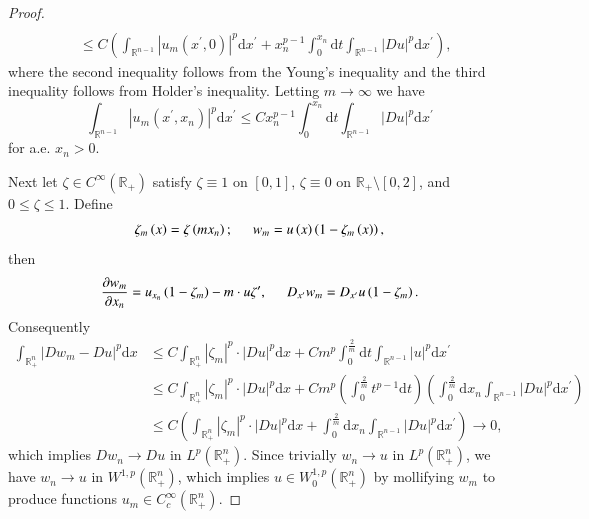 \begin{proof}
$$\begin{aligned}
\\
&\le C\left( \int_{\mathbb{R} ^{n-1}}{\left| u_m\left( x^{\prime},0 \right) \right|^p\mathrm{d}x^{\prime}}+x_{n}^{p-1}\int_0^{x_n}{\mathrm{d}t\int_{\mathbb{R} ^{n-1}}{\left| Du \right|^p\mathrm{d}x^{\prime}}} \right) ,
\end{aligned}
$$
where the second inequality follows from the Young's inequality and the third inequality follows from Holder's inequality. Letting $m\to\infty$ we have 
$$
\int_{\mathbb{R} ^{n-1}}{\left| u_m\left( x^{\prime},x_n \right) \right|^p\mathrm{d}x^{\prime}}\le Cx_{n}^{p-1}\int_0^{x_n}{\mathrm{d}t\int_{\mathbb{R} ^{n-1}}{\left| Du \right|^p\mathrm{d}x^{\prime}}}
$$
for a.e. $x_n>0$.\par
Next let $\zeta\in C^\infty(\mathbb{R}_+)$ satisfy $\zeta\equiv 1$ on $[0,1]$, $\zeta\equiv 0$ on $\mathbb{R}_+\setminus[0,2]$, and $0\le\zeta\le 1$. Define 
$$
\zeta _m\left( x \right) =\zeta \left( mx_n \right) ;\hspace{0.5cm}w_m=u\left( x \right) \left( 1-\zeta _m\left( x \right) \right) ,
$$
then 
$$
\frac{\partial w_m}{\partial x_n}=u_{x_n}\left( 1-\zeta _m \right) -m\cdot u\zeta ^{\prime},\hspace{0.5cm}D_{x^{\prime}}w_m=D_{x^{\prime}}u\left( 1-\zeta _m \right) .
$$
Consequently 
$$
\begin{aligned}
\int_{\mathbb{R} _{+}^{n}}{\left| Dw_m-Du \right|^p\mathrm{d}x}&\le C\int_{\mathbb{R} _{+}^{n}}{\left| \zeta _m \right|^p\cdot \left| Du \right|^p\mathrm{d}x}+Cm^p\int_0^{\frac{2}{m}}{\mathrm{d}t\int_{\mathbb{R} ^{n-1}}{\left| u \right|^p\mathrm{d}x^{\prime}}}
\\
&\le C\int_{\mathbb{R} _{+}^{n}}{\left| \zeta _m \right|^p\cdot \left| Du \right|^p\mathrm{d}x}+Cm^p\left( \int_0^{\frac{2}{m}}{t^{p-1}\mathrm{d}t} \right) \left( \int_0^{\frac{2}{m}}{\mathrm{d}x_n\int_{\mathbb{R} ^{n-1}}{\left| Du \right|^p\mathrm{d}x^{\prime}}} \right) 
\\
&\le C\left( \int_{\mathbb{R} _{+}^{n}}{\left| \zeta _m \right|^p\cdot \left| Du \right|^p\mathrm{d}x}+\int_0^{\frac{2}{m}}{\mathrm{d}x_n\int_{\mathbb{R} ^{n-1}}{\left| Du \right|^p\mathrm{d}x^{\prime}}} \right) \rightarrow 0,
\end{aligned}
$$
which implies $Dw_n\to Du$ in $L^p(\mathbb{R}_+^n)$. Since trivially $w_n\to u$ in $L^p(\mathbb{R}_+^n)$, we have $w_n\to u$ in $W^{1,p}(\mathbb{R}_+^n)$, which implies $u\in W^{1,p}_0(\mathbb{R}_+^n)$ by mollifying $w_m$ to produce functions $u_m\in C_c^\infty(\mathbb{R}_+^n)$.
\end{proof}
